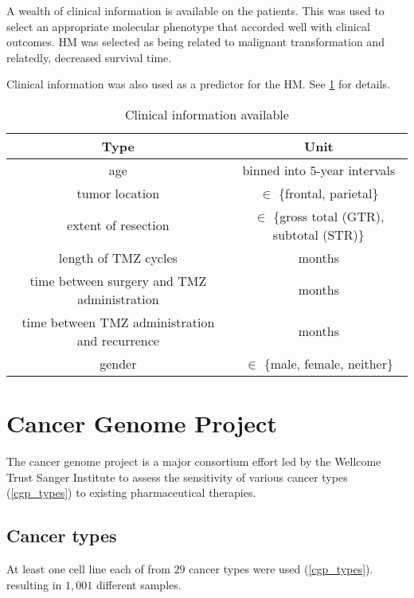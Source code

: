 A wealth of clinical information is available on the patients. This
was used to select an appropriate molecular phenotype that accorded
well with clinical outcomes. HM was selected as being
related to malignant transformation and relatedly, decreased survival
time.

Clinical information was also used as a predictor for the HM. See
\ref{avail_clin} for details.


  \begin{table}
    \begin{center}
      \begin{tabular}{|c|c|} \hline \textbf{Type} &
        \textbf{Unit} \\ \hline
        age & binned into $5$-year intervals \\
        tumor location & $\in$ \{frontal, parietal\} \\
        extent of resection & $\in$ \{gross total (GTR), subtotal (STR)\} \\
        length of TMZ cycles & months \\
        time between surgery and TMZ administration & months \\
        time between TMZ administration and recurrence & months \\
        gender & $\in$ \{male, female, neither\}\\ \hline 
      \end{tabular}
    \end{center}
    \caption{Clinical information available} \label{avail_clin}
  \end{table}


\section{Cancer Genome Project}

The cancer genome project is a major consortium effort led by the Wellcome
Trust Sanger Institute to assess the sensitivity of various cancer
types (\ref{cgp_types}) to existing pharmaceutical therapies.


\subsection{Cancer types}

At least one cell line each of from $29$ cancer types were used (\ref{cgp_types}).
resulting in $1,001$ different samples. 

